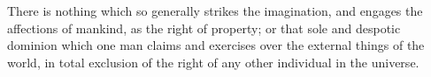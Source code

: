 There is nothing which so generally strikes the imagination, and engages the
affections of mankind, as the right of property; or that sole and despotic
dominion which one man claims and exercises over the external things of the
world, in total exclusion of the right of any other individual in the universe.

